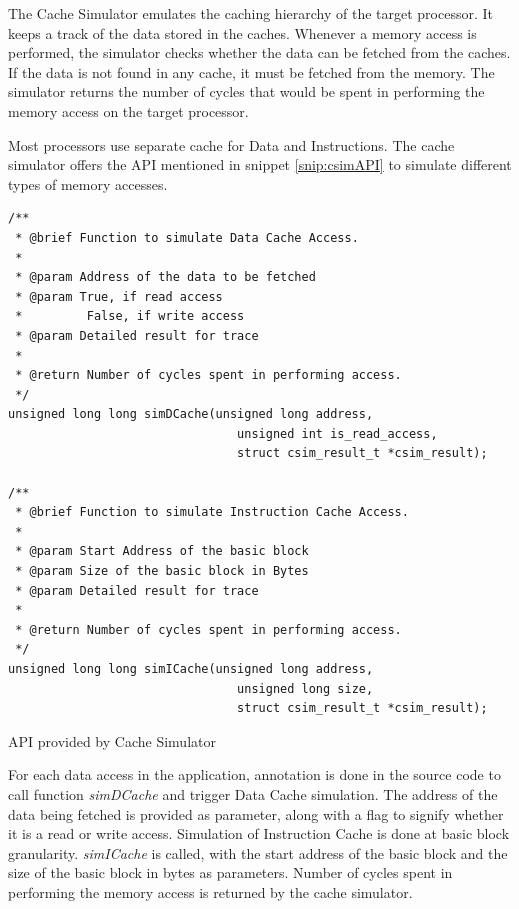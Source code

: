The Cache Simulator emulates the caching hierarchy of the target processor. It keeps a track of the data stored in the caches. Whenever a memory access is performed, the simulator checks whether the data can be fetched from the caches. If the data is not found in any cache, it must be fetched from the memory. The simulator returns the number of cycles that would be spent in performing the memory access on the target processor.

Most processors use separate cache for Data and Instructions. The cache simulator offers the API mentioned in snippet \ref{snip:csimAPI} to simulate different types of memory accesses.

\vspace*{10pt}
\begin{Snippet}[h]
\begin{lstlisting}[numbers=none]
/**
 * @brief Function to simulate Data Cache Access.
 *
 * @param Address of the data to be fetched
 * @param True, if read access
 *         False, if write access
 * @param Detailed result for trace
 *
 * @return Number of cycles spent in performing access.
 */
unsigned long long simDCache(unsigned long address,
                                unsigned int is_read_access,
                                struct csim_result_t *csim_result);
                                
/**
 * @brief Function to simulate Instruction Cache Access.
 *
 * @param Start Address of the basic block
 * @param Size of the basic block in Bytes
 * @param Detailed result for trace 
 *
 * @return Number of cycles spent in performing access.
 */
unsigned long long simICache(unsigned long address,
                                unsigned long size,
                                struct csim_result_t *csim_result);
\end{lstlisting}
\caption{API provided by Cache Simulator}
\label{snip:csimAPI}
\end{Snippet}

For each data access in the application, annotation is done in the source code to call function \emph{simDCache} and trigger Data Cache simulation. The address of the data being fetched is provided as parameter, along with a flag to signify whether it is a read or write access. Simulation of Instruction Cache is done at basic block granularity. \emph{simICache} is called, with the start address of the basic block and the size of the basic block in bytes as parameters. Number of cycles spent in performing the memory access is returned by the cache simulator.

